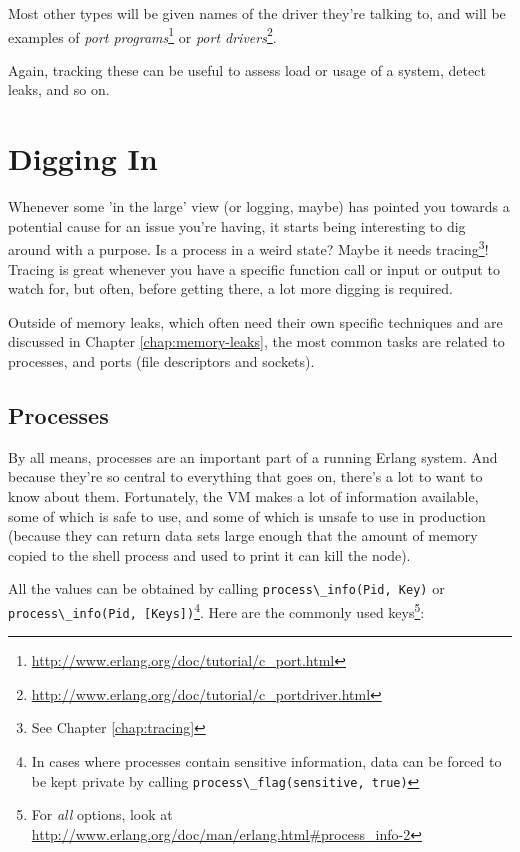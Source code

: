 \documentclass[11pt, oneside]{book}   	%
\newcommand{\expression}[1]{\Verb`#1`}
\begin{document}
Most other types will be given names of the driver they're talking to, and will be examples of \emph{port programs}\footnote{\href{http://www.erlang.org/doc/tutorial/c\_port.html}{http://www.erlang.org/doc/tutorial/c\_port.html}} or \emph{port drivers}\footnote{\href{http://www.erlang.org/doc/tutorial/c\_portdriver.html}{http://www.erlang.org/doc/tutorial/c\_portdriver.html}}.

Again, tracking these can be useful to assess load or usage of a system, detect leaks, and so on.

\section{Digging In}
\label{sec:digging-in}

Whenever some 'in the large' view (or logging, maybe) has pointed you towards a potential cause for an issue you're having, it starts being interesting to dig around with a purpose. Is a process in a weird state? Maybe it needs tracing\footnote{See Chapter \ref{chap:tracing}}! Tracing is great whenever you have a specific function call or input or output to watch for, but often, before getting there, a lot more digging is required.

Outside of memory leaks, which often need their own specific techniques and are discussed in Chapter \ref{chap:memory-leaks}, the most common tasks are related to processes, and ports (file descriptors and sockets).

\subsection{Processes}
\label{subsec:digging-procs}

By all means, processes are an important part of a running Erlang system. And because they're so central to everything that goes on, there's a lot to want to know about them. Fortunately, the VM makes a lot of information available, some of which is safe to use, and some of which is unsafe to use in production (because they can return data sets large enough that the amount of memory copied to the shell process and used to print it can kill the node).

All the values can be obtained by calling \expression{process\_info(Pid, Key)} or \newline \expression{process\_info(Pid, [Keys])}\footnote{In cases where processes contain sensitive information, data can be forced to be kept private by calling \expression{process\_flag(sensitive, true)}}. Here are the commonly used keys\footnote{For \emph{all} options, look at \href{http://www.erlang.org/doc/man/erlang.html\#process\_info-2}{http://www.erlang.org/doc/man/erlang.html\#process\_info-2}}:
\end{document}
